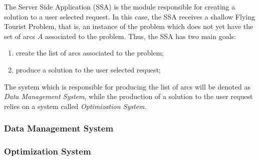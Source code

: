 The Server Side Application (SSA) is the module responsible for creating a solution 
to a user selected request. In this case, the SSA receives a shallow Flying Tourist Problem,
that is, an instance of the problem which does not yet have the set of arcs $A$ associated to the problem.
Thus, the SSA has two main goals:

\begin{enumerate}
  \item create the list of arcs associated to the problem;
  \item produce a solution to the user selected request;
\end{enumerate}

The system which is responsible for producing the list of arcs will be denoted as \textit{Data Management System},
while the production of a solution to the user request relies on a system called \textit{Optimization System}.


\subsubsection{Data Management System}
\label{sec:dms_design}


\subsubsection{Optimization System}
\label{sec:optimization_design}


